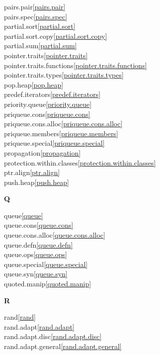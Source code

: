 \begin{multicols}{2}
pairs.pair\quad\ref{pairs.pair}\\
pairs.spec\quad\ref{pairs.spec}\\
partial.sort\quad\ref{partial.sort}\\
partial.sort.copy\quad\ref{partial.sort.copy}\\
partial.sum\quad\ref{partial.sum}\\
pointer.traits\quad\ref{pointer.traits}\\
pointer.traits.functions\quad\ref{pointer.traits.functions}\\
pointer.traits.types\quad\ref{pointer.traits.types}\\
pop.heap\quad\ref{pop.heap}\\
predef.iterators\quad\ref{predef.iterators}\\
priority.queue\quad\ref{priority.queue}\\
priqueue.cons\quad\ref{priqueue.cons}\\
priqueue.cons.alloc\quad\ref{priqueue.cons.alloc}\\
priqueue.members\quad\ref{priqueue.members}\\
priqueue.special\quad\ref{priqueue.special}\\
propagation\quad\ref{propagation}\\
protection.within.classes\quad\ref{protection.within.classes}\\
ptr.align\quad\ref{ptr.align}\\
push.heap\quad\ref{push.heap}\\
\par \textbf{Q}\par
queue\quad\ref{queue}\\
queue.cons\quad\ref{queue.cons}\\
queue.cons.alloc\quad\ref{queue.cons.alloc}\\
queue.defn\quad\ref{queue.defn}\\
queue.ops\quad\ref{queue.ops}\\
queue.special\quad\ref{queue.special}\\
queue.syn\quad\ref{queue.syn}\\
quoted.manip\quad\ref{quoted.manip}\\
\par \textbf{R}\par
rand\quad\ref{rand}\\
rand.adapt\quad\ref{rand.adapt}\\
rand.adapt.disc\quad\ref{rand.adapt.disc}\\
rand.adapt.general\quad\ref{rand.adapt.general}\\

\end{multicols}
